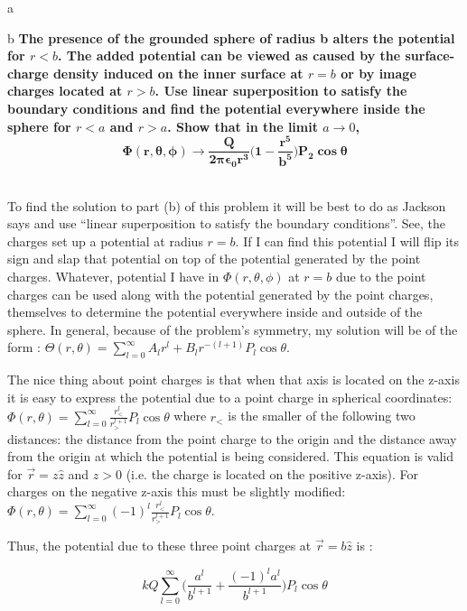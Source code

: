 \begin{homeworkProblem}[Jackson 3rd ed. : 3.7]
\begin{homeworkSection}{a}
\end{homeworkSection}

\begin{homeworkSection}{b}
\textbf{
The presence of the grounded sphere of radius b alters the potential for $r<b$. 
The added potential can be viewed as caused by the surface-charge density 
induced on the inner surface at $r=b$ or by image charges located at $r > b$. 
Use linear superposition to satisfy the boundary conditions and find the potential everywhere inside the sphere for $r < a$ and $r > a$. Show that in the 
limit $a\rightarrow 0$, 
\[
\mathbf{\Phi(r,\theta,\phi) \rightarrow \frac{Q}{2\pi\epsilon_0 r^3}\bigg(1-\frac{r^5}{b^5}\bigg)P_2\cos\theta}
\]
}
\\ \par
To find the solution to part (b) of this problem it will be best to do as Jackson says and use ``linear superposition to satisfy the boundary conditions''. See, the charges set up a potential at radius $r = b$. If I can find this potential I will flip its sign and slap that potential on top of the potential generated by the point charges. Whatever, potential I have in $\Phi(r,\theta,\phi)$ at $r=b$ 
due to the point charges can be used along with the potential generated by the point charges, themselves to determine the potential everywhere inside and outside of the sphere. In general, because of the problem's symmetry, my solution will be of the form : $\Theta(r,\theta) = \sum\limits_{l=0}^{\infty} A_l r^l + B_l r^{-(l+1)} P_l\cos\theta$.
\\ \par
The nice thing about point charges is that when that axis is located on the z-axis it is easy to express the potential due to a point charge in spherical coordinates: $\Phi(r,\theta) = \sum\limits_{l=0}^{\infty} \frac{r_<^l}{r_>^{l+1}} P_l\cos\theta$ where $r_<$ is the smaller of the following two distances: the distance from the point charge to the origin and the distance away from the origin at which the potential is being considered. This equation is valid for $\vec{r} = z \hat{z}$ and $z > 0$ (i.e. the charge is located on the positive z-axis). For charges on the negative z-axis this must be slightly modified: $\Phi(r,\theta) = \sum\limits_{l=0}^{\infty} (-1)^l \frac{r_<^l}{r_>^{l+1}} P_l\cos\theta$.
\\ \par
Thus, the potential due to these three point charges at $\vec{r} = b \hat{z}$ is :

\[
kQ \sum\limits_{l=0}^{\infty}\Big(\frac{a^l}{b^{l+1}} + \frac{(-1)^l a^l}{b^{l+1}}\Big) P_l\cos\theta
\]


\end{homeworkSection}
\end{homeworkProblem}
